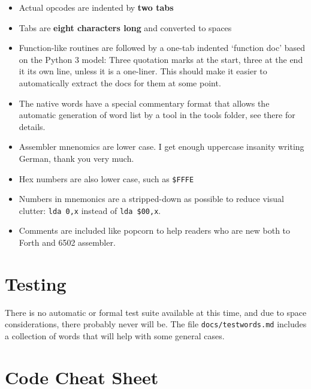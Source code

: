 \begin{itemize}

        \item Actual opcodes are indented by \textbf{two tabs}

        \item Tabs are \textbf{eight characters long} and converted to spaces

        \item Function-like routines are followed by a one-tab indented
                `function doc' based on the Python 3 model: Three quotation
                marks at the start, three at the end it its own line, unless it
                is a one-liner. This should make it easier to automatically
                extract the docs for them at some point.

        \item The native words have a special commentary format that allows the
                automatic generation of word list by a tool in the tools folder,
                see there for details.

        \item Assembler mnenomics are lower case. I get enough uppercase
                insanity writing German, thank you very much.

        \item Hex numbers are also lower case, such as \texttt{\$FFFE}

        \item Numbers in mnemonics are a stripped-down as possible to reduce
                visual clutter: \texttt{lda 0,x} instead of \texttt{lda \$00,x}.

        \item Comments are included like popcorn to help readers who are new
                both to Forth and 6502 assembler.

\end{itemize}


\section{Testing}

There is no automatic or formal test suite available at this time, and due to
space considerations, there probably never will be. The file
\texttt{docs/testwords.md} includes a collection of words that will help with
some general cases.

\section{Code Cheat Sheet}

